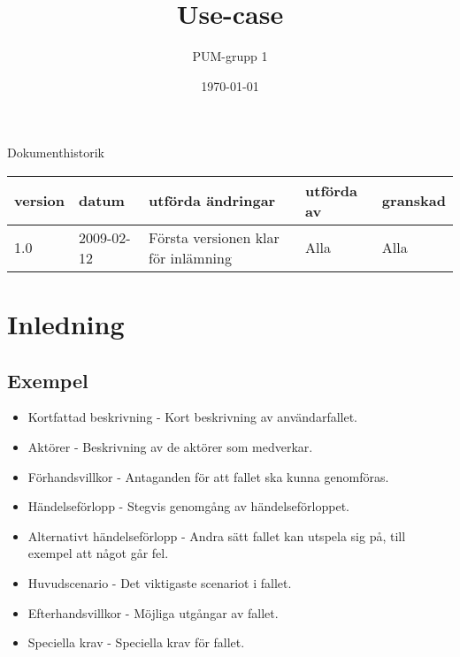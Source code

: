 

\ifpdf
\else
\fi

\title{Use-case}
\author{PUM-grupp 1}
\date{\today}



\maketitle\thispagestyle{empty}

\newpage

{\centering \Large{Dokumenthistorik\\}}

\vspace{10pt}
\begin{tabularx}{\textwidth}{ |l|l|X|l|l| }
  \hline
    \textbf{version} & \textbf{datum} & \textbf{utförda ändringar} & \textbf{utförda av} & \textbf{granskad} \\
	\hline 
  1.0 & 2009-02-12 &  Första versionen klar för inlämning  & Alla & Alla   \\
  \hline
\end{tabularx}

\newpage
\setcounter{tocdepth}{2}
\tableofcontents
\newpage
\section{Inledning}


\subsection{Exempel}
\begin{itemize}
	\item Kortfattad beskrivning - Kort beskrivning av användarfallet.
	\item Aktörer - Beskrivning av de aktörer som medverkar.
	\item Förhandsvillkor - Antaganden för att fallet ska kunna genomföras.
	\item Händelseförlopp - Stegvis genomgång av händelseförloppet.
	\item Alternativt händelseförlopp - Andra sätt fallet kan utspela sig på, till exempel att något går fel.
	\item Huvudscenario - Det viktigaste scenariot i fallet.
	\item Efterhandsvillkor - Möjliga utgångar av fallet.
	\item Speciella krav - Speciella krav för fallet.
\end{itemize}

